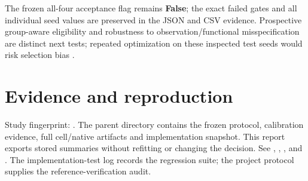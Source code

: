 \documentclass[11pt,a4paper]{article}
\begin{document}
The frozen all-four acceptance flag remains \textbf{False}; the exact failed
gates and all individual seed values are preserved in the JSON and CSV evidence.
Prospective group-aware eligibility and robustness to observation/functional
misspecification are distinct next tests; repeated optimization on these inspected
test seeds would risk selection bias \citep{cawley2010overfitting}.

\section{Evidence and reproduction}
Study fingerprint: . The parent directory contains the frozen
protocol, calibration evidence, full cell/native artifacts and implementation
snapshot. This report exports stored summaries without refitting or changing the
decision. See , ,
,  and
. The implementation-test log records the regression suite;
the project protocol supplies the reference-verification audit.
{\small\setlength{\bibsep}{1pt}}
\end{document}
